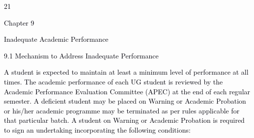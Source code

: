 \documentclass[12pt]{article}
\begin{document}
\vspace{\baselineskip}

\vspace{\baselineskip}

\vspace{\baselineskip}

\vspace{\baselineskip}
\begin{adjustwidth}{0.0in}{-0.1in}
\begin{Center}
\textcolor[HTML]{00000A}{21}
\end{Center}\par

\end{adjustwidth}


\vspace{\baselineskip}
\begin{adjustwidth}{0.07in}{0.0in}
{\fontsize{14pt}{16.8pt}\selectfont \textcolor[HTML]{00000A}{Chapter 9}\par}\par

\end{adjustwidth}


\vspace{\baselineskip}
\begin{adjustwidth}{0.07in}{0.0in}
{\fontsize{20pt}{24.0pt}\selectfont \textcolor[HTML]{00000A}{Inadequate Academic Performance}\par}\par

\end{adjustwidth}


\vspace{\baselineskip}
\begin{adjustwidth}{0.07in}{0.0in}
\textcolor[HTML]{00000A}{9.1 Mechanism to Address Inadequate Performance}\par

\end{adjustwidth}


\vspace{\baselineskip}
\begin{adjustwidth}{0.07in}{0.0in}
\begin{justify}
{\fontsize{10pt}{12.0pt}\selectfont \textcolor[HTML]{00000A}{A student is expected to maintain at least a minimum level of performance at all times. The academic performance of each UG student is reviewed by the Academic Performance Evaluation Committee (APEC) at the end of each regular semester. A deficient student may be placed on Warning or Academic Probation or his/her academic programme may be terminated as per rules applicable for that particular batch. A student on Warning or Academic Probation is required to sign an undertaking incorporating the following conditions:}\par}
\end{justify}\par

\end{adjustwidth}
\end{document}

